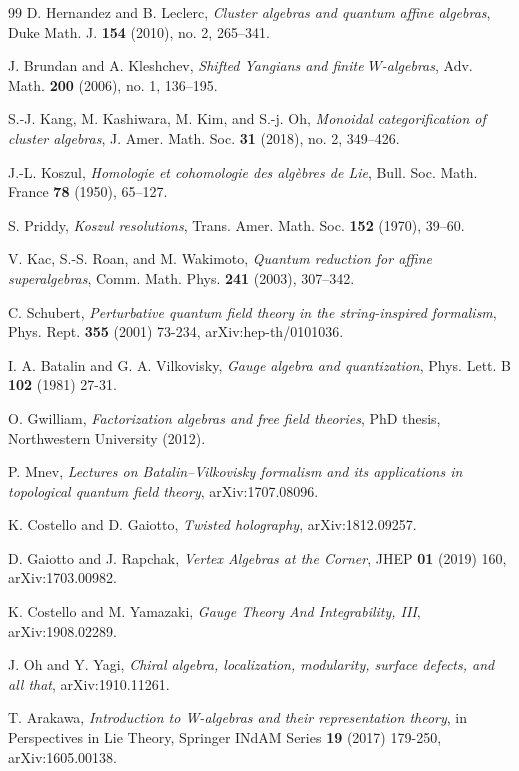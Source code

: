 \begin{thebibliography}{99}
 D. Hernandez and B. Leclerc, \emph{Cluster algebras and quantum affine algebras}, Duke Math. J. \textbf{154} (2010), no. 2, 265--341.

 J. Brundan and A. Kleshchev, \emph{Shifted Yangians and finite $W$-algebras}, Adv. Math. \textbf{200} (2006), no. 1, 136--195.

 S.-J. Kang, M. Kashiwara, M. Kim, and S.-j. Oh, \emph{Monoidal categorification of cluster algebras}, J. Amer. Math. Soc. \textbf{31} (2018), no. 2, 349--426.

 J.-L. Koszul, \emph{Homologie et cohomologie des alg\`ebres de Lie}, Bull. Soc. Math. France \textbf{78} (1950), 65--127.

 S. Priddy, \emph{Koszul resolutions}, Trans. Amer. Math. Soc. \textbf{152} (1970), 39--60.

 V. Kac, S.-S. Roan, and M. Wakimoto, \emph{Quantum reduction for affine superalgebras}, Comm. Math. Phys. \textbf{241} (2003), 307--342.


C. Schubert, \emph{Perturbative quantum field theory in the string-inspired formalism}, 
Phys. Rept. \textbf{355} (2001) 73-234, arXiv:hep-th/0101036.


I. A. Batalin and G. A. Vilkovisky, \emph{Gauge algebra and quantization}, 
Phys. Lett. B \textbf{102} (1981) 27-31.

O. Gwilliam, \emph{Factorization algebras and free field theories}, 
PhD thesis, Northwestern University (2012).

P. Mnev, \emph{Lectures on Batalin--Vilkovisky formalism and its applications 
in topological quantum field theory}, arXiv:1707.08096.


K. Costello and D. Gaiotto, \emph{Twisted holography}, 
arXiv:1812.09257.

D. Gaiotto and J. Rapchak, \emph{Vertex Algebras at the Corner}, 
JHEP \textbf{01} (2019) 160, arXiv:1703.00982.

K. Costello and M. Yamazaki, \emph{Gauge Theory And Integrability, III}, 
arXiv:1908.02289.

J. Oh and Y. Yagi, \emph{Chiral algebra, localization, modularity, surface defects, 
and all that}, arXiv:1910.11261.


T. Arakawa, \emph{Introduction to W-algebras and their representation theory}, 
in Perspectives in Lie Theory, Springer INdAM Series \textbf{19} (2017) 179-250, 
arXiv:1605.00138.


\end{thebibliography}

